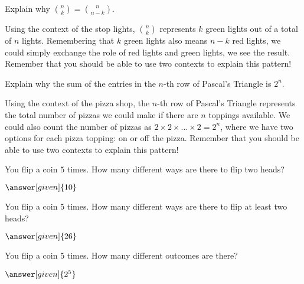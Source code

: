 \documentclass[nooutcomes]{ximera}
\begin{document}
\begin{problem}
Explain why ${n \choose k} = {n \choose n-k}$.
\begin{freeResponse}
	\begin{hint}
		Using the context of the stop lights, ${n \choose k}$ represents $k$ green lights out of a total of $n$ lights.  Remembering that $k$ green lights also means $n-k$ red lights, we could simply exchange the role of red lights and green lights, we see the result.  Remember that you should be able to use two contexts to explain this pattern!
	\end{hint}
\end{freeResponse}
\end{problem}



\begin{problem}
Explain why the sum of the entries in the $n$-th row of Pascal's Triangle is $2^n$.
\begin{freeResponse}
	\begin{hint}
		Using the context of the pizza shop, the $n$-th row of Pascal's Triangle represents the total number of pizzas we could make if there are $n$ toppings available.  We could also count the number of pizzas as $2 \times 2 \times ... \times 2 = 2^n$, where we have two options for each pizza topping: on or off the pizza.  Remember that you should be able to use two contexts to explain this pattern!
	\end{hint}
\end{freeResponse}
\end{problem}



\begin{problem}
	You flip a coin $5$ times.  How many different ways are there to flip two heads?
	\begin{prompt}
		$\answer[given]{10}$
	\end{prompt}
\end{problem}

\begin{problem}
	You flip a coin $5$ times.  How many different ways are there to flip at least two heads?
	\begin{prompt}
		$\answer[given]{26}$
	\end{prompt}
\end{problem}


\begin{problem}
	You flip a coin $5$ times.  How many different outcomes are there?
	\begin{prompt}
		$\answer[given]{2^5}$
	\end{prompt}
\end{problem}
\end{document}
